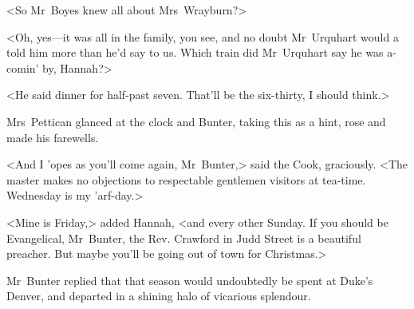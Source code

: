 <So Mr~Boyes knew all about Mrs~Wrayburn?>

<Oh, yes—it was all in the family, you see, and no doubt Mr~Urquhart would a told him more than he'd say to us. Which train did Mr~Urquhart say he was a-comin' by, Hannah?>

<He said dinner for half-past seven. That'll be the six-thirty, I should think.>

Mrs~Pettican glanced at the clock and Bunter, taking this as a hint, rose and made his farewells.

<And I 'opes as you'll come again, Mr~Bunter,> said the Cook, graciously. <The master makes no objections to respectable gentlemen visitors at tea-time. Wednesday is my 'arf-day.>

<Mine is Friday,> added Hannah, <and every other Sunday. If you should be Evangelical, Mr~Bunter, the Rev. Crawford in Judd Street is a beautiful preacher. But maybe you'll be going out of town for Christmas.>

Mr~Bunter replied that that season would undoubtedly be spent at Duke's Denver, and departed in a shining halo of vicarious splendour.